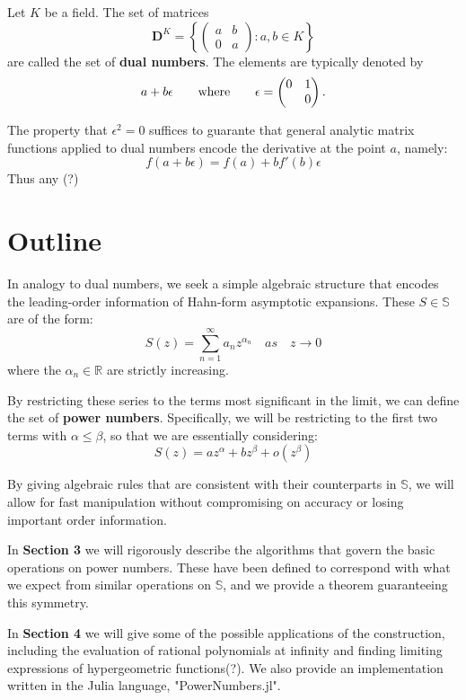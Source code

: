 \documentclass[acmsmall]{acmart}
\begin{document}
\begin{definition}
Let $K$ be a field. The set of matrices
$$\mathbf{D}^K = \left\{\begin{pmatrix}a & b \\ 0 & a \end{pmatrix} : a,b \in K\right\}$$ 
are called the set of \textbf{dual numbers}. The elements are typically denoted by
$$
a + b \epsilon \qquad \hbox{where} \qquad \epsilon = \begin{pmatrix} 0 & 1 \\ & 0 \end{pmatrix}.
$$
\end{definition}

The property that $\epsilon^2 = 0 $ suffices to guarante that general analytic matrix functions applied to dual numbers encode the derivative at the point $a$, namely:
$$
f(a + b \epsilon) = f(a) + b f'(b) \epsilon
$$
Thus any (?)

\section{Outline}
In analogy to dual numbers, we seek a simple algebraic structure that encodes the leading-order information of Hahn-form asymptotic expansions. These $S\in \mathbb{S}$ are of the form:
$$S(z) = \sum_{n=1}^{\infty}a_nz^{\alpha_n} \quad as \quad z \rightarrow 0$$
where the $\alpha_n \in \mathbb{R}$ are strictly increasing.

By restricting these series to the terms most significant in the limit, we can define the set of \textbf{power numbers}. Specifically, we will be restricting to the first two terms with $\alpha \leq \beta$, so that we are essentially considering:
$$S(z) = az^\alpha + bz^\beta + o(z^\beta)$$

By giving algebraic rules that are consistent with their counterparts in $\mathbb{S}$, we will allow for fast manipulation without compromising on accuracy or losing important order information. 

In \textbf{Section 3} we will rigorously describe the algorithms that govern the basic operations on power numbers. These have been defined to correspond with what we expect from similar operations on $\mathbb{S}$, and we provide a theorem guaranteeing this symmetry.

In \textbf{Section 4} we will give some of the possible applications of the construction, including the evaluation of rational polynomials at infinity and finding limiting expressions of hypergeometric functions(?). We also provide an implementation written in the Julia language, "PowerNumbers.jl".
\end{document}
